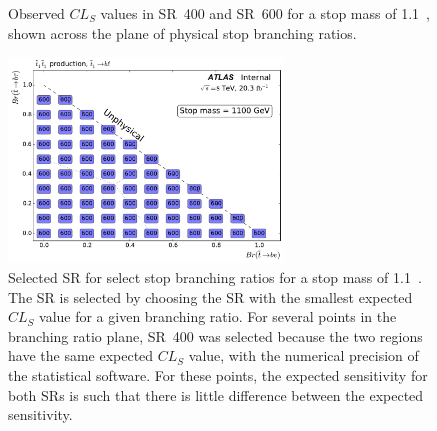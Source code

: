 \begin{figure}[ht]
  \centering
  \caption{
    Observed $CL_S$ values in SR~400 and SR~600 for a stop mass of 1.1~\TeV,
    shown across the plane of physical stop branching ratios.
  }
\end{figure}

\begin{figure}[ht]
  \centering
  \includegraphics[width=0.65\textwidth]
    {figs/blstop/region_selection/region_choice_vs_br_m_1100.pdf}
  \caption{
    Selected SR for select stop branching ratios for a stop mass of 1.1~\TeV.
    The SR is selected by choosing the SR with the smallest expected $CL_S$
    value for a given branching ratio.
    For several points in the branching ratio plane, SR~400 was selected because
    the two regions have the same expected $CL_S$ value, with the numerical
    precision of the statistical software.
    For these points, the expected sensitivity for both SRs is such that
    there is little difference between the expected sensitivity.
  }
\end{figure}

